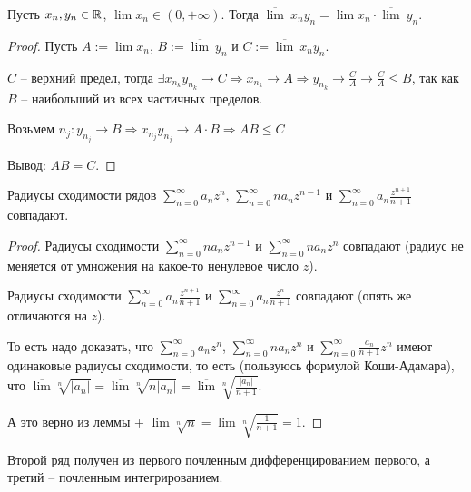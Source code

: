 \begin{lemma}
    Пусть $x_n, y_n\in \mathbb{R}$, $\lim x_n\in (0, +\infty)$. Тогда $\overline{\lim }\ x_n y_n=\lim x_n\cdot \overline{\lim }\ y_n$.
\end{lemma}

\begin{proof}
    Пусть $A:=\lim x_n$, $B:=\overline{\lim}\ y_n$ и $C:=\overline{\lim}\ x_ny_n$. 
    
    $C$ – верхний предел, тогда $\exists x_{n_k}y_{n_k}\rightarrow C\Rightarrow x_{n_k}\rightarrow A\Rightarrow y_{n_k}\rightarrow\frac{C}{A}\rightarrow \frac{C}{A}\leq B$, так как $B$ – наибольший из всех частичных пределов.

    Возьмем $n_j: y_{n_j}\rightarrow B\Rightarrow x_{n_j}y_{n_j}\rightarrow A\cdot B\Rightarrow AB\leq C$

    Вывод: $AB=C$.
\end{proof}

\begin{corollary}
    Радиусы сходимости рядов $\sum\limits_{n=0}^\infty a_nz^n$,  $\sum\limits_{n=0}^\infty na_nz^{n-1}$ и $\sum\limits_{n=0}^\infty a_n\frac{z^{n+1}}{n+1}$ совпадают.
\end{corollary}

\begin{proof}
    Радиусы сходимости $\sum\limits_{n=0}^\infty na_{n}z^{n-1}$ и $\sum\limits_{n=0}^\infty na_{n}z^n$ совпадают (радиус не меняется от умножения на какое-то ненулевое число $z$).

    Радиусы сходимости $\sum\limits_{n=0}^\infty a_n\frac{z^{n+1}}{n+1}$ и $\sum\limits_{n=0}^\infty a_{n}\frac{z^n}{n+1}$ совпадают (опять же отличаются на $z$).

    То есть надо доказать, что  $\sum\limits_{n=0}^\infty a_{n}z^{n}$, $\sum\limits_{n=0}^\infty na_{n}z^n$ и $\sum\limits_{n=0}^\infty\frac{a_n}{n+1}z^n$ имеют одинаковые радиусы сходимости, то есть (пользуюсь формулой Коши-Адамара), что $\overline{\lim}\sqrt[n]{|a_n|}=\overline{\lim}\sqrt[n]{n|a_n|}=\overline{\lim}\sqrt[n]{\frac{|a_n|}{n+1}}$.

    А это верно из леммы + $\lim \sqrt[n]{n}=\lim \sqrt[n]{\frac{1}{n+1}}=1$.
\end{proof}

\begin{remark}
    Второй ряд получен из первого почленным дифференцированием первого, а третий – почленным интегрированием.
\end{remark}

